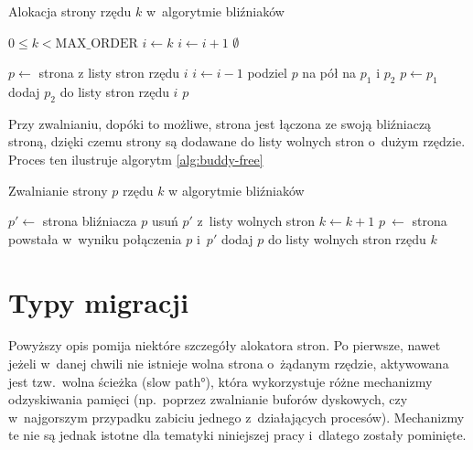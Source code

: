 \begin{algorithm}
\caption{Alokacja strony rzędu $k$ w~algorytmie bliźniaków}
\label{alg:buddy-alloc}
\begin{algorithmic}[1]
\Require $0 \leq k < \mathrm{MAX\_ORDER}$
    \State $i \gets k$
        \State $i \gets i + 1$
            \State \Return $\emptyset$
        \EndIf
    \EndWhile

    \State $p \gets$ strona z listy stron rzędu $i$
        \State $i \gets i - 1$
        \State podziel $p$ na pół na $p_1$ i $p_2$
        \State $p \gets p_1$
        \State dodaj $p_2$ do listy stron rzędu $i$
    \EndWhile
    \State \Return $p$
\EndFunction
\end{algorithmic}
\end{algorithm}

Przy zwalnianiu, dopóki to możliwe, strona jest łączona ze swoją
bliźniaczą stroną, dzięki czemu strony są dodawane do listy wolnych
stron o~dużym rzędzie.  Proces ten ilustruje algorytm
\ref{alg:buddy-free}

\begin{algorithm}
\caption{Zwalnianie strony $p$ rzędu $k$ w algorytmie bliźniaków}
\label{alg:buddy-free}
\begin{algorithmic}[1]
        \State $p' \gets$ strona bliźniacza $p$
        \State usuń $p'$ z~listy wolnych stron
        \State $k \gets k + 1$
        \State $p~\gets$ strona powstała w~wyniku połączenia $p$ i~$p'$ \label{alg:buddy-free:join}
    \EndWhile
    \State dodaj $p$ do listy wolnych stron rzędu $k$ \label{alg:buddy-free:add}
\EndProcedure
\end{algorithmic}
\end{algorithm}


\section{Typy migracji}\label{sec:migratetype}

Powyższy opis pomija niektóre szczegóły alokatora stron.  Po pierwsze,
nawet jeżeli w~danej chwili nie istnieje wolna strona o~żądanym
rzędzie, aktywowana jest tzw.\ wolna ścieżka (\ang{slow path}), która
wykorzystuje różne mechanizmy odzyskiwania pamięci (np.\ poprzez
zwalnianie buforów dyskowych, czy w~najgorszym przypadku zabiciu
jednego z~działających procesów).  Mechanizmy te nie są jednak istotne
dla tematyki niniejszej pracy i~dlatego zostały pominięte.

